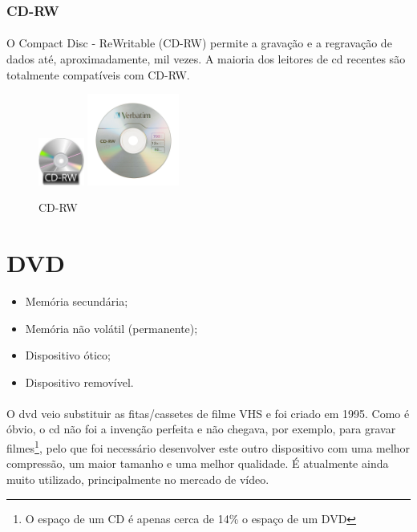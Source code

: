 \documentclass[a4paper]{report}
\begin{document}
\subsubsection{CD-RW} 
\paragraph*{}O Compact Disc - ReWritable (CD-RW) permite a gravação e a regravação de dados até, aproximadamente, mil vezes. A maioria dos leitores de \ac{cd} recentes são totalmente compatíveis com CD-RW.

\begin{figure}[H]
\center
\includegraphics[width=1.5cm]{Imagens/cd-rw.jpg}
\includegraphics[width=3cm]{Imagens/cd-rw-ex.jpg}
\caption{CD-RW}
\end{figure}

\newpage

\section{DVD}
\label{sect.dvd}

\begin{itemize}
\item Memória secundária;
\item Memória não volátil (permanente);
\item Dispositivo ótico;
\item Dispositivo removível.
\end{itemize}

\paragraph*{}O \ac{dvd} veio substituir as fitas/cassetes de filme VHS e foi criado em 1995. Como é óbvio, o \ac{cd} não foi a invenção perfeita e não chegava, por exemplo, para gravar filmes\footnote{O espaço de um CD é apenas cerca de 14\% o espaço de um DVD}, pelo que foi necessário desenvolver este outro dispositivo com uma melhor compressão, um maior tamanho e uma melhor qualidade.
É atualmente ainda muito utilizado, principalmente no mercado de vídeo.
\end{document}
